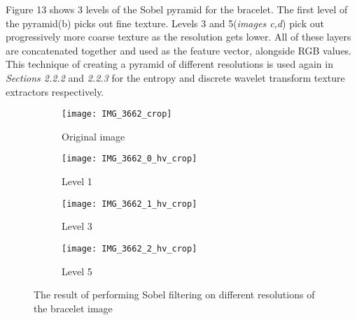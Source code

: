 \documentclass[12pt]{IIBproject}
\begin{document}
 Figure 13 shows 3 levels of the Sobel pyramid for the bracelet. The first level of the pyramid(b) picks out fine texture. Levels 3 and 5(\emph{images c,d}) pick out progressively more coarse texture as the resolution gets lower. All of these layers are concatenated together and used as the feature vector, alongside RGB values. This technique of creating a pyramid of different resolutions is used again in \emph{Sections 2.2.2} and \emph{2.2.3} for the entropy and discrete wavelet transform texture extractors respectively.
 \begin{figure}[H]
\centering
\begin{subfigure}{.45\textwidth}
  \centering
  \texttt{[image: IMG\_3662\_crop]}
  \caption{Original image}
  \label{fig:sub1}
\end{subfigure}%
\begin{subfigure}{.45\textwidth}
  \centering
  \texttt{[image: IMG\_3662\_0\_hv\_crop]}
  \caption{Level 1}
  \label{fig:sub2}
\end{subfigure}
\begin{subfigure}{.45\textwidth}
  \centering
  \texttt{[image: IMG\_3662\_1\_hv\_crop]}
  \caption{Level 3}
  \label{fig:sub2}
\end{subfigure}
\begin{subfigure}{.45\textwidth}
  \centering
  \texttt{[image: IMG\_3662\_2\_hv\_crop]}
  \caption{Level 5}
  \label{fig:sub2}
\end{subfigure}
\caption{The result of performing Sobel filtering on different resolutions of the bracelet image}
\label{fig:test}
\end{figure}
\end{document}
